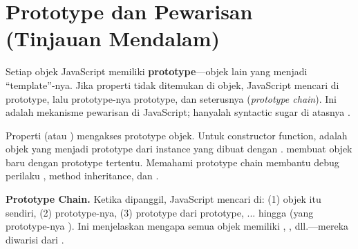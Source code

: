 \section{Prototype dan Pewarisan (Tinjauan Mendalam)}

Setiap objek JavaScript memiliki \textbf{prototype}---objek lain yang menjadi ``template''-nya. Jika properti tidak ditemukan di objek, JavaScript mencari di prototype, lalu prototype-nya prototype, dan seterusnya (\textit{prototype chain}). Ini adalah mekanisme pewarisan di JavaScript;  hanyalah syntactic sugar di atasnya \cite{jsInfo}.

Properti  (atau ) mengakses prototype objek. Untuk constructor function,  adalah objek yang menjadi prototype dari instance yang dibuat dengan .  membuat objek baru dengan prototype tertentu. Memahami prototype chain membantu debug perilaku , method inheritance, dan  \cite{eloquentJs}.

\begin{konsep}
\textbf{Prototype Chain.} Ketika  dipanggil, JavaScript mencari  di: (1) objek itu sendiri, (2) prototype-nya, (3) prototype dari prototype, ... hingga  (yang prototype-nya ). Ini menjelaskan mengapa semua objek memiliki , , dll.---mereka diwarisi dari  \cite{mdnJsGuide}.
\end{konsep}

